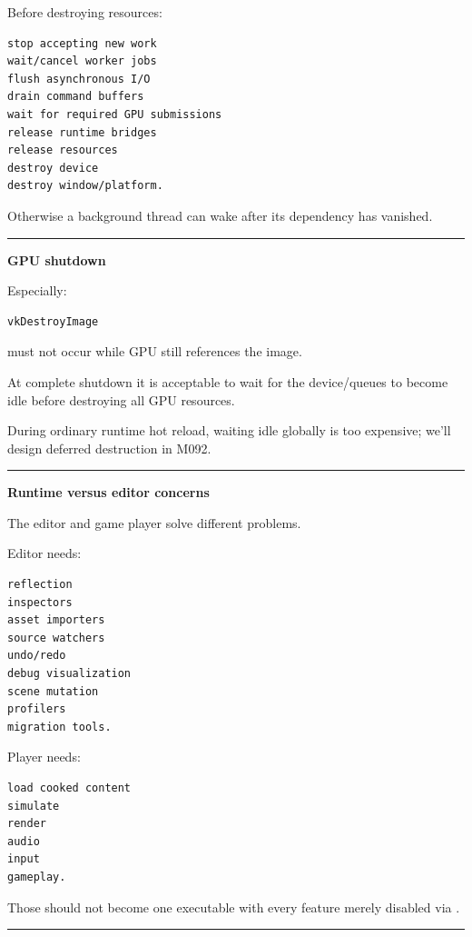 Before destroying resources:

\begin{verbatim}
stop accepting new work
wait/cancel worker jobs
flush asynchronous I/O
drain command buffers
wait for required GPU submissions
release runtime bridges
release resources
destroy device
destroy window/platform.
\end{verbatim}

Otherwise a background thread can wake after its dependency has vanished.

\begin{center}\rule{0.5\linewidth}{0.5pt}\end{center}

\textbf{GPU shutdown}

Especially:

\begin{verbatim}
vkDestroyImage
\end{verbatim}

must not occur while GPU still references the image.

At complete shutdown it is acceptable to wait for the device/queues to become idle before destroying all GPU resources.

During ordinary runtime hot reload, waiting idle globally is too expensive; we'll design deferred destruction in M092.

\begin{center}\rule{0.5\linewidth}{0.5pt}\end{center}

\textbf{Runtime versus editor concerns}

The editor and game player solve different problems.

Editor needs:

\begin{verbatim}
reflection
inspectors
asset importers
source watchers
undo/redo
debug visualization
scene mutation
profilers
migration tools.
\end{verbatim}

Player needs:

\begin{verbatim}
load cooked content
simulate
render
audio
input
gameplay.
\end{verbatim}

Those should not become one executable with every feature merely disabled via .

\begin{center}\rule{0.5\linewidth}{0.5pt}\end{center}

